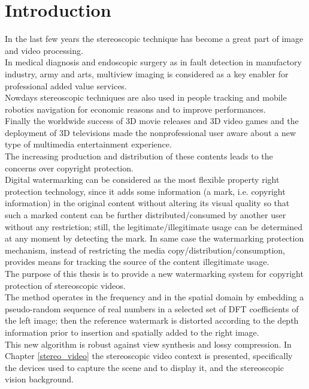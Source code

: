 \chapter*{Introduction}
\label{intro}
{}

In the last few years the stereoscopic technique has become a great part of image and video processing.\\
In medical diagnosis and endoscopic surgery \cite{MED}\cite{MED2} as in fault detection in manufactory industry, army and arts,
multiview imaging is considered as a key enabler  for professional added value services.\\
Nowdays stereoscopic techniques are also used in people tracking \cite{TRACK} and mobile robotics
navigation \cite{PG} for economic reasons and to improve performances.\\
Finally the worldwide success of 3D movie releases and 3D video games \cite{GAME} and the deployment of 3D televisions made the nonprofessional user aware about a new type of multimedia entertainment experience.\\
The increasing production and distribution of these contents leads to the concerns over copyright protection.\\
Digital watermarking can be considered as the most flexible property right protection technology, since it adds some information (a mark, i.e. copyright information) in the
original content without altering its visual quality so that such a marked content can be further distributed/consumed by another user without any restriction; still, the legitimate/illegitimate usage can be determined at any moment by detecting the mark. In same case the watermarking protection mechanism, instead of restricting the media copy/distribution/consumption, provides means for tracking the source of the content illegitimate usage.\\
The purpose of this thesis is to provide a new watermarking system for copyright protection of stereoscopic videos.\\
The method operates in the frequency and in the spatial domain by embedding a pseudo-random sequence of real numbers in a selected set of DFT coefficients of the left image; then the reference watermark is distorted according to the depth information prior to insertion and spatially added to the right image.\\
This new algorithm is robust against view synthesis and lossy compression.
In Chapter \ref{stereo_video} the stereoscopic video context is presented, specifically the devices used to capture the scene and to display it, and the stereoscopic vision background.\\

